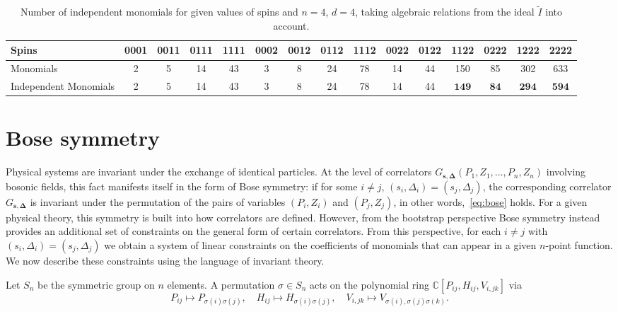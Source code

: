 \documentclass[12pt,a4paper]{extarticle}
\theoremstyle{definition}
\begin{document}
\begin{table}[h]
\centering
\small
\setlength{\tabcolsep}{3.5pt} 
\renewcommand{\arraystretch}{1.2}
\begin{tabular}{|p{2cm}|c|c|c|c|c|c|c|c|c|c|c|c|c|c|}
\hline
Spins 
& 0001 & 0011 & 0111 & 1111 
& 0002 & 0012 & 0112 & 1112 
& 0022 & 0122 & 1122 & 0222 & 1222 & 2222 \\
\hline
Monomials
& 2 & 5 & 14 & 43
& 3 & 8 & 24 & 78
& 14 & 44 & 150 & 85 & 302 & 633
\\
\hline
Independent Monomials
& 2 & 5 & 14 & 43
& 3 & 8 & 24 & 78
& 14 & 44 & $\mathbf{149}$ & $\mathbf{84}$ & $\mathbf{294}$ & $\mathbf{594}$ \\
\hline
\end{tabular}
\caption{Number of independent monomials for given values of spins and $n=4$, $d=4$, taking algebraic relations from the ideal $\tilde{I}$ into account.}\label{table:7}
\end{table}

\section{Bose symmetry}\label{sec: Bose}
Physical systems are invariant under the exchange of identical particles. 
At the level of correlators $G_{\mathbf{s},\mathbf{\Delta}}(P_1,Z_1,\ldots,P_n,Z_n)$ involving bosonic fields, this fact manifests itself in the form of Bose symmetry: if for some $i\neq j$, $(s_i,\Delta_i)=(s_j,\Delta_j)$, the corresponding correlator $G_{\mathbf{s},\mathbf{\Delta}}$ is invariant under the permutation of the pairs of variables $(P_i,Z_i)$ and $(P_j,Z_j)$, in other words,~\eqref{eq:bose} holds. For a given physical theory, this symmetry is built into how correlators are defined. However, from the bootstrap perspective Bose symmetry instead provides an additional set of constraints on the general form of certain correlators. From this perspective, for each $i\neq j$ with $(s_i,\Delta_i)=(s_j,\Delta_j)$ we obtain a system of linear constraints on the coefficients of monomials that can appear in a given $n$-point function.
We now describe these constraints using the language of invariant theory.

\medskip

Let $S_n$ be the symmetric group on $n$ elements. A permutation $\sigma\in S_n$ acts on the polynomial ring $\mathbb{C}[P_{ij}, H_{ij}, V_{i,jk}]$ via 
\begin{equation} \label{eq:BosePHV}
    P_{ij} \mapsto P_{\sigma(i)\sigma(j)},\quad
    H_{ij}\mapsto H_{\sigma(i)\sigma(j)},\quad
    V_{i,jk}\mapsto V_{\sigma(i),\sigma(j)\sigma(k)}.
\end{equation}
\end{document}
